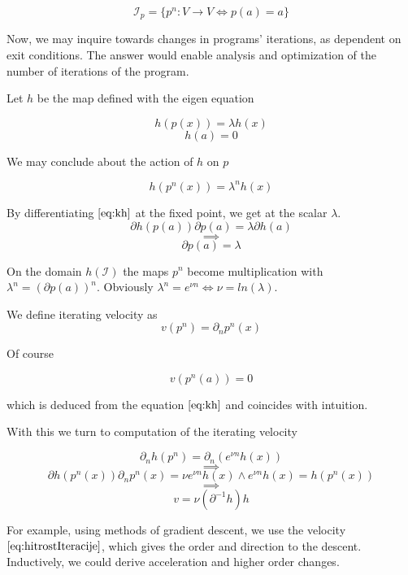 \documentclass{article}
\newcommand{\D}{\partial}
\begin{document}
  \begin{equation}
  \mathcal{I}_p=\{p^n:V\to V\iff p(a)=a\}
  \end{equation}
  
  Now, we may inquire towards changes in programs' iterations, as dependent on exit conditions. The answer would enable analysis and optimization of the number of iterations of the program. 
  
  Let $h$ be the map defined with the eigen equation
    
  \begin{equation}\label{eq:kh}
  h(p(x))=\lambda h(x)
  \end{equation}
   \begin{equation}
   h(a)=0
   \end{equation}
  
  We may conclude about the action of $h$ on $p$
  
  \begin{equation}
  h(p^n(x))=\lambda^nh(x)
  \end{equation}
  
  By differentiating $\eqref{eq:kh}$ at the fixed point, we get at the scalar $\lambda$.
  $$\D h(p(a))\D p(a)=\lambda\D h(a)$$
  $$\implies$$
  $$\D p(a)=\lambda$$
  
  On the domain $h(\mathcal{I})$ the maps $p^n$ become multiplication with $\lambda^n=(\D p(a))^n$. Obviously $\lambda^n=e^{\nu n}\iff \nu=ln(\lambda)$.
  
  We define iterating velocity as
  \begin{equation}
  v(p^n)=\D_np^n(x)
  \end{equation}
  
  Of course
  
  \begin{equation}
  v(p^n(a))=0
  \end{equation}
  
  which is deduced from the equation $\eqref{eq:kh}$ and coincides with intuition.
  
  With this we turn to computation of the iterating velocity
 
  $$\D_nh(p^n)=\D_n(e^{\nu n}h(x))$$
  $$\implies$$
  $$\D h(p^n(x))\D_np^n(x)=\nu e^{\nu n}h(x) \land e^{\nu n}h(x)=h(p^n(x))$$
  $$\implies$$
  \begin{equation}\label{eq:hitrostIteracije}
  v=\nu(\D^{-1}h)h
  \end{equation}
  
  For example, using methods of gradient descent, we use the velocity $\eqref{eq:hitrostIteracije}$, which gives the order and direction to the descent. Inductively, we could derive acceleration and higher order changes.
  
\end{document}
